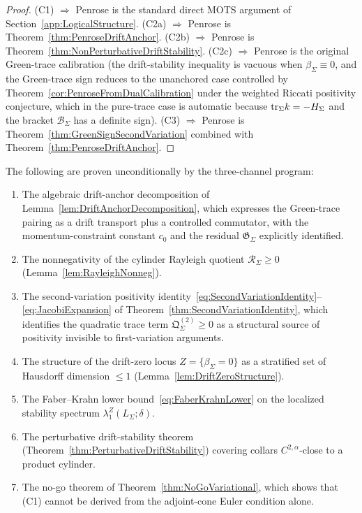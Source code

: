 \begin{proof}
(C1) $\Rightarrow$ Penrose is the standard direct MOTS argument of Section~\ref{app:LogicalStructure}. (C2a) $\Rightarrow$ Penrose is Theorem~\ref{thm:PenroseDriftAnchor}. (C2b) $\Rightarrow$ Penrose is Theorem~\ref{thm:NonPerturbativeDriftStability}. (C2c) $\Rightarrow$ Penrose is the original Green-trace calibration (the drift-stability inequality is vacuous when $\beta_\Sigma\equiv0$, and the Green-trace sign reduces to the unanchored case controlled by Theorem~\ref{cor:PenroseFromDualCalibration} under the weighted Riccati positivity conjecture, which in the pure-trace case is automatic because $\mathrm{tr}_\Sigma k = -H_\Sigma$ and the bracket $\mathcal B_\Sigma$ has a definite sign). (C3) $\Rightarrow$ Penrose is Theorem~\ref{thm:GreenSignSecondVariation} combined with Theorem~\ref{thm:PenroseDriftAnchor}.
\end{proof}

\begin{remark}\label{rem:UnconditionalResults}
The following are proven unconditionally by the three-channel program:
\begin{enumerate}
    \item The algebraic drift-anchor decomposition of Lemma~\ref{lem:DriftAnchorDecomposition}, which expresses the Green-trace pairing as a drift transport plus a controlled commutator, with the momentum-constraint constant $c_0$ and the residual $\mathfrak G_\Sigma$ explicitly identified.
    \item The nonnegativity of the cylinder Rayleigh quotient $\mathcal R_\Sigma\ge0$ (Lemma~\ref{lem:RayleighNonneg}).
    \item The second-variation positivity identity~\eqref{eq:SecondVariationIdentity}--\eqref{eq:JacobiExpansion} of Theorem~\ref{thm:SecondVariationIdentity}, which identifies the quadratic trace term $\mathfrak Q_\Sigma^{(2)}\ge0$ as a structural source of positivity invisible to first-variation arguments.
    \item The structure of the drift-zero locus $Z=\{\beta_\Sigma=0\}$ as a stratified set of Hausdorff dimension $\le1$ (Lemma~\ref{lem:DriftZeroStructure}).
    \item The Faber--Krahn lower bound~\eqref{eq:FaberKrahnLower} on the localized stability spectrum $\lambda_1^Z(L_\Sigma;\delta)$.
    \item The perturbative drift-stability theorem (Theorem~\ref{thm:PerturbativeDriftStability}) covering collars $C^{2,\alpha}$-close to a product cylinder.
    \item The no-go theorem of Theorem~\ref{thm:NoGoVariational}, which shows that (C1) cannot be derived from the adjoint-cone Euler condition alone.
\end{enumerate}
\end{remark}

